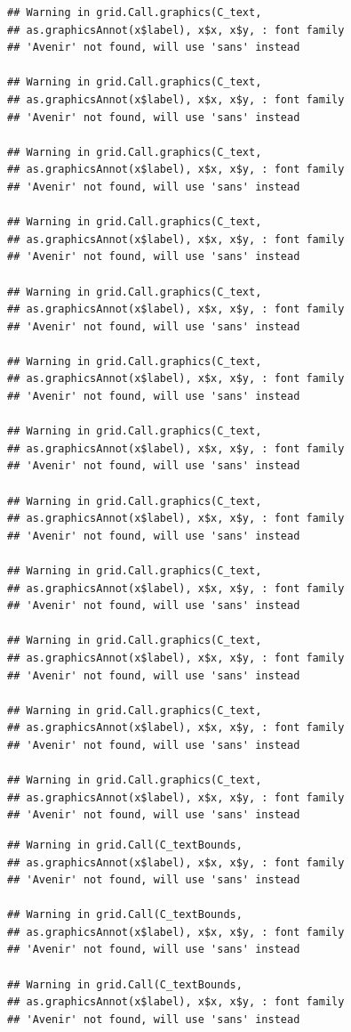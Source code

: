 \documentclass[]{krantz}
\begin{document}
\begin{verbatim}
## Warning in grid.Call.graphics(C_text,
## as.graphicsAnnot(x$label), x$x, x$y, : font family
## 'Avenir' not found, will use 'sans' instead

## Warning in grid.Call.graphics(C_text,
## as.graphicsAnnot(x$label), x$x, x$y, : font family
## 'Avenir' not found, will use 'sans' instead

## Warning in grid.Call.graphics(C_text,
## as.graphicsAnnot(x$label), x$x, x$y, : font family
## 'Avenir' not found, will use 'sans' instead

## Warning in grid.Call.graphics(C_text,
## as.graphicsAnnot(x$label), x$x, x$y, : font family
## 'Avenir' not found, will use 'sans' instead

## Warning in grid.Call.graphics(C_text,
## as.graphicsAnnot(x$label), x$x, x$y, : font family
## 'Avenir' not found, will use 'sans' instead

## Warning in grid.Call.graphics(C_text,
## as.graphicsAnnot(x$label), x$x, x$y, : font family
## 'Avenir' not found, will use 'sans' instead

## Warning in grid.Call.graphics(C_text,
## as.graphicsAnnot(x$label), x$x, x$y, : font family
## 'Avenir' not found, will use 'sans' instead

## Warning in grid.Call.graphics(C_text,
## as.graphicsAnnot(x$label), x$x, x$y, : font family
## 'Avenir' not found, will use 'sans' instead

## Warning in grid.Call.graphics(C_text,
## as.graphicsAnnot(x$label), x$x, x$y, : font family
## 'Avenir' not found, will use 'sans' instead

## Warning in grid.Call.graphics(C_text,
## as.graphicsAnnot(x$label), x$x, x$y, : font family
## 'Avenir' not found, will use 'sans' instead

## Warning in grid.Call.graphics(C_text,
## as.graphicsAnnot(x$label), x$x, x$y, : font family
## 'Avenir' not found, will use 'sans' instead

## Warning in grid.Call.graphics(C_text,
## as.graphicsAnnot(x$label), x$x, x$y, : font family
## 'Avenir' not found, will use 'sans' instead
\end{verbatim}

\begin{verbatim}
## Warning in grid.Call(C_textBounds,
## as.graphicsAnnot(x$label), x$x, x$y, : font family
## 'Avenir' not found, will use 'sans' instead

## Warning in grid.Call(C_textBounds,
## as.graphicsAnnot(x$label), x$x, x$y, : font family
## 'Avenir' not found, will use 'sans' instead

## Warning in grid.Call(C_textBounds,
## as.graphicsAnnot(x$label), x$x, x$y, : font family
## 'Avenir' not found, will use 'sans' instead
\end{verbatim}
\end{document}
